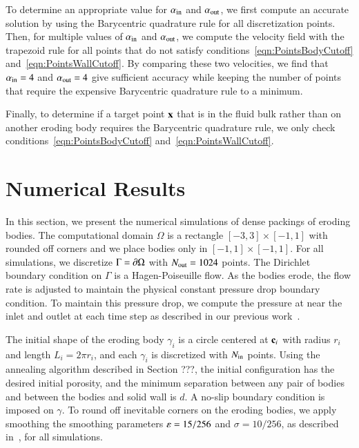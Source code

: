 \documentclass[preprint, 10pt]{elsarticle}
\begin{document}
To determine an appropriate value for $\alpha_{\mathrm{in}}$ and $\alpha_{\mathrm{out}}$,
we first compute an accurate solution by using the Barycentric
quadrature rule for all discretization points.  Then, for multiple
values of $\alpha_{\mathrm{in}}$ and $\alpha_{\mathrm{out}}$, we compute the velocity field
with the trapezoid rule for all points that do not satisfy
conditions~\eqref{eqn:PointsBodyCutoff}
and~\eqref{eqn:PointsWallCutoff}.  By comparing these two velocities, we
find that {\color{red}$\alpha_{\mathrm{in}} = 4$ and $\alpha_{\mathrm{out}} = 4$ }give sufficient
accuracy while keeping the number of points that require the expensive
Barycentric quadrature rule to a minimum.

Finally, to determine if a target point ${\mathbf{x}}$ that is in the fluid bulk
rather than on another eroding body requires the Barycentric quadrature
rule, we only check conditions~\eqref{eqn:PointsBodyCutoff}
and~\eqref{eqn:PointsWallCutoff}.  




\section{Numerical Results}
\label{s:results}
In this section, we present the numerical simulations of dense packings
of eroding bodies.  The computational domain $\Omega$ is a rectangle
$[-3,3] \times [-1,1]$ with rounded off corners and we place bodies only
in $[-1,1] \times [-1,1]$.  For all simulations, we discretize $\Gamma =
{\partial} \Omega$ with $N_{\mathrm{out}}=1024$ points.  The Dirichlet boundary condition
on $\Gamma$ is a Hagen-Poiseuille flow.  As the bodies erode, the flow
rate is adjusted to maintain the physical constant pressure drop
boundary condition.  To maintain this pressure drop, we compute the
pressure at near the inlet and outlet at each time step as described in
our previous work~\cite{qua-moo2018}.

The initial shape of the eroding body $\gamma_i$ is a circle centered at
${\mathbf{c}}_i$ with radius $r_i$ and length $L_i = 2\pi r_i$, and each
$\gamma_i$ is discretized with $N_{\mathrm{in}}$ points.  Using the annealing
algorithm described in Section ???, the initial configuration has the
desired initial porosity, and the minimum separation between any pair of
bodies and between the bodies and solid wall is $d$.  A no-slip boundary
condition is imposed on $\gamma$.  To round off inevitable corners on
the eroding bodies, we apply smoothing the smoothing parameters {\color{red}
$\varepsilon=15/256$ and $\sigma=10/256$,} as described in~\cite{qua-moo2018}, for all
simulations.  
\end{document}
